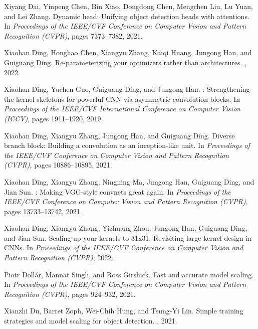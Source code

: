\documentclass[10pt,twocolumn,letterpaper]{article}
\begin{document}
{\begin{thebibliography}{100}
				Xiyang Dai, Yinpeng Chen, Bin Xiao, Dongdong Chen, Mengchen Liu, Lu Yuan, and
				Lei Zhang.
				\newblock Dynamic head: Unifying object detection heads with attentions.
				\newblock In {\em Proceedings of the IEEE/CVF Conference on Computer Vision and
					Pattern Recognition (CVPR)}, pages 7373--7382, 2021.
				
				Xiaohan Ding, Honghao Chen, Xiangyu Zhang, Kaiqi Huang, Jungong Han, and
				Guiguang Ding.
				\newblock Re-parameterizing your optimizers rather than architectures.
				, 2022.
				
				Xiaohan Ding, Yuchen Guo, Guiguang Ding, and Jungong Han.
				: Strengthening the kernel skeletons for powerful {CNN} via
				asymmetric convolution blocks.
				\newblock In {\em Proceedings of the IEEE/CVF International Conference on
					Computer Vision (ICCV)}, pages 1911--1920, 2019.
				
				Xiaohan Ding, Xiangyu Zhang, Jungong Han, and Guiguang Ding.
				\newblock Diverse branch block: Building a convolution as an inception-like
				unit.
				\newblock In {\em Proceedings of the IEEE/CVF Conference on Computer Vision and
					Pattern Recognition (CVPR)}, pages 10886--10895, 2021.
				
				Xiaohan Ding, Xiangyu Zhang, Ningning Ma, Jungong Han, Guiguang Ding, and Jian
				Sun.
				: Making {VGG}-style convnets great again.
				\newblock In {\em Proceedings of the IEEE/CVF Conference on Computer Vision and
					Pattern Recognition (CVPR)}, pages 13733--13742, 2021.
				
				Xiaohan Ding, Xiangyu Zhang, Yizhuang Zhou, Jungong Han, Guiguang Ding, and
				Jian Sun.
				\newblock Scaling up your kernels to 31x31: Revisiting large kernel design in
				{CNNs}.
				\newblock In {\em Proceedings of the IEEE/CVF Conference on Computer Vision and
					Pattern Recognition (CVPR)}, 2022.
				
				Piotr Doll{\'a}r, Mannat Singh, and Ross Girshick.
				\newblock Fast and accurate model scaling.
				\newblock In {\em Proceedings of the IEEE/CVF Conference on Computer Vision and
					Pattern Recognition (CVPR)}, pages 924--932, 2021.
				
				Xianzhi Du, Barret Zoph, Wei-Chih Hung, and Tsung-Yi Lin.
				\newblock Simple training strategies and model scaling for object detection.
				, 2021.
				

\end{thebibliography}}
\end{document}
